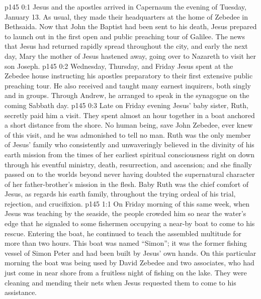 \author{Midwayer Commission}
\vs p145 0:1 Jesus and the apostles arrived in Capernaum the evening of Tuesday, January 13. As usual, they made their headquarters at the home of Zebedee in Bethsaida. Now that John the Baptist had been sent to his death, Jesus prepared to launch out in the first open and public preaching tour of Galilee. The news that Jesus had returned rapidly spread throughout the city, and early the next day, Mary the mother of Jesus hastened away, going over to Nazareth to visit her son Joseph.\plusone
\vs p145 0:2 Wednesday, Thursday, and Friday Jesus spent at the Zebedee house instructing his apostles preparatory to their first extensive public preaching tour. He also received and taught many earnest inquirers, both singly and in groups. Through Andrew, he arranged to speak in the synagogue on the coming Sabbath day.
\vs p145 0:3 Late on Friday evening Jesus’ baby sister, Ruth, secretly paid him a visit. They spent almost an hour together in a boat anchored a short distance from the shore. No human being, save John Zebedee, ever knew of this visit, and he was admonished to tell no man. Ruth was the only member of Jesus’ family who consistently and unwaveringly believed in the divinity of his earth mission from the times of her earliest spiritual consciousness right on down through his eventful ministry, death, resurrection, and ascension; and she finally passed on to the worlds beyond never having doubted the supernatural character of her father\hyp{}brother’s mission in the flesh. Baby Ruth was the chief comfort of Jesus, as regards his earth family, throughout the trying ordeal of his trial, rejection, and crucifixion.
\vs p145 1:1 On Friday morning of this same week, when Jesus was teaching by the seaside, the people crowded him so near the water’s edge that he signaled to some fishermen occupying a near\hyp{}by boat to come to his rescue. Entering the boat, he continued to teach the assembled multitude for more than two hours. This boat was named “Simon”; it was the former fishing vessel of Simon Peter and had been built by Jesus’ own hands. On this particular morning the boat was being used by David Zebedee and two associates, who had just come in near shore from a fruitless night of fishing on the lake. They were cleaning and mending their nets when Jesus requested them to come to his assistance.
